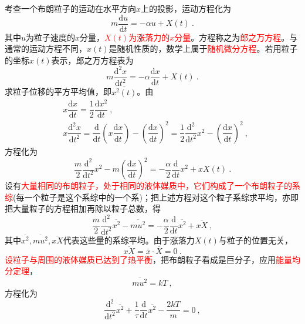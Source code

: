 \documentclass[11pt,a4paper]{article}
\newcommand{\dif}{\mathrm{d}}
\begin{document}
考查一个布朗粒子的运动在水平方向$x$上的投影，运动方程化为
\begin{equation}
m \dfrac{\dif u}{\dif t} = - \alpha u +X(t) ~.
\end{equation}
其中$u$为粒子速度的$x$分量，\textcolor{red}{$X(t)$为涨落力的$x$分量}。方程称之为\textcolor{red}{郎之万方程}。与通常的运动方程不同，$x(t)$是随机性质的，数学上属于\textcolor{red}{随机微分方程}。若用粒子的坐标$x(t)$表示，郎之万方程表为
\begin{equation}
m \dfrac{\dif^2 x}{\dif t^2} =  - \alpha \dfrac{\dif x}{\dif t}  +X(t) ~.
\end{equation}
求粒子位移的平方平均值，即$\overline{x^2(t)}$。由
\begin{align}
\nonumber & x \dfrac{\dif x}{\dif t}  = \dfrac{1}{2} \dfrac{\dif x^2}{\dif t} ~, \\
\nonumber & x \dfrac{\dif^2 x}{\dif t^2} = \dfrac{\dif }{\dif t} \left(x\dfrac{\dif x}{\dif t} \right) - \left(\dfrac{\dif x}{\dif t} \right)^2 = \dfrac{1}{2} \dfrac{\dif^2 }{\dif t^2} x^2 - \left(\dfrac{\dif x}{\dif t} \right)^2 ~,
\end{align}
方程化为
\begin{equation}
\dfrac{m}{2} \dfrac{\dif^2 }{\dif t^2} x^2 - m \left(\dfrac{\dif x}{\dif t} \right)^2 = -\dfrac{\alpha}{2} \dfrac{\dif }{\dif t} x^2 +xX(t) ~.
\end{equation}
设有\textcolor{red}{大量相同的布朗粒子，处于相同的液体媒质中，它们构成了一个布朗粒子的系综}(每一个粒子是这个系综中的一个系)；把上述方程对这个粒子系综求平均，亦即把大量粒子的方程相加再除以粒子总数，得
\begin{equation}
\dfrac{m}{2} \dfrac{\dif^2 }{\dif t^2} \overline{x^2} - \overline{mu^2} = -\dfrac{\alpha}{2} \dfrac{\dif }{\dif t}  \overline{x^2} + \overline{xX } ~,
\end{equation}
其中$\overline{x^2} , \overline{mu^2}, \overline{xX }$代表这些量的系综平均。由于涨落力$X(t)$与粒子的位置无关，
\begin{equation}
 \overline{xX } =  \overline{x}\cdot  \overline{X } = 0 ~.
\end{equation}
\textcolor{red}{设粒子与周围的液体媒质已达到了热平衡}，把布朗粒子看成是巨分子，应用\textcolor{red}{能量均分定理}，
\begin{equation}
\overline{mu^2} = kT ~,
\end{equation}
方程化为
\begin{equation}
\dfrac{\dif^2 }{\dif t^2} \overline{x^2} +\dfrac{1}{\tau} \dfrac{\dif }{\dif t} \overline{x^2} - \dfrac{2kT}{m} = 0 ~,
\end{equation}
\end{document}
